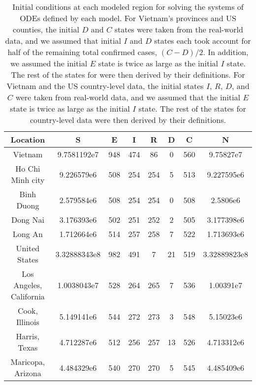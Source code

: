 \begin{table}[h]
    \centering
    \begin{tabular}{| c | c | c | c | c | c | c | c |}
        Location & S & E & I & R & D & C & N \\
        \hline\hline
        Vietnam & 9.7581192e7 & 948 & 474 & 86 & 0 & 560 & 9.75827e7 \\
        \hline
        Ho Chi Minh city & 9.226579e6 & 508 & 254 & 254 & 5 & 513 & 9.227595e6 \\
        \hline
        Binh Duong & 2.579584e6 & 508 & 254 & 254 & 0 & 508 & 2.5806e6 \\
        \hline
        Dong Nai & 3.176393e6 & 502 & 251 & 252 & 2 & 505 & 3.177398e6 \\
        \hline
        Long An & 1.712664e6 & 514 & 257 & 258 & 7 & 522 & 1.713693e6 \\
        \hline
        United States & 3.32888343e8 & 982 & 491 & 7 & 21 & 519 & 3.32889823e8 \\
        \hline
        Los Angeles, California & 1.0038043e7 & 528 & 264 & 265 & 7 & 536 & 1.00391e7 \\
        \hline
        Cook, Illinois & 5.149141e6 & 544 & 272 & 273 & 3 & 548 & 5.15023e6 \\
        \hline
        Harris, Texas & 4.712287e6 & 512 & 256 & 257 & 13 & 526 & 4.713312e6 \\
        \hline
        Maricopa, Arizona & 4.484329e6 & 540 & 270 & 270 & 5 & 545 & 4.485409e6 \\
        \hline
    \end{tabular}
    \caption{Initial conditions at each modeled region for solving the systems of \glspl{ODE} defined by each model. For Vietnam's provinces and \gls{US} counties, the initial $D$ and $C$ states were taken from the real-world data, and we assumed that initial $I$ and $D$ states each took account for half of the remaining total confirmed cases, $(C - D) / 2$. In addition, we assumed the initial $E$ state is twice as large as the initial $I$ state. The rest of the states for were then derived by their definitions. For Vietnam and the \gls{US} country-level data, the initial states $I$, $R$, $D$, and $C$ were taken from real-world data, and we assumed that the initial $E$ state is twice as large as the initial $I$ state. The rest of the states for country-level data were then derived by their definitions.}
    \label{tab:ude-model-initial-conditions}
\end{table}

